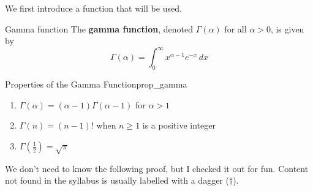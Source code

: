 We first introduce a function that will be used.

\begin{Definition}{Gamma function}{}
    The \textbf{gamma function},
    denoted $ \Gamma(\alpha) $ for all $ \alpha>0 $, is given by
    \[ \Gamma(\alpha)=\int_{0}^{\infty} x^{\alpha-1}e^{-x}\, d{x}  \]
\end{Definition}
\begin{Proposition}{Properties of the Gamma Function}{prop_gamma}
    \begin{enumerate}[label=(\arabic*)]
        \item\label{gamma_prop_1}$ \Gamma(\alpha)=(\alpha-1)\Gamma(\alpha-1) $ for $ \alpha>1 $
        \item\label{gamma_prop_2} $ \Gamma(n)=(n-1)! $ when $ n\geqslant 1 $ is a positive integer
        \item\label{gamma_prop_3} $ \displaystyle \Gamma\left( \frac{1}{2} \right)=\sqrt{\pi} $
    \end{enumerate}
\end{Proposition}
We don't need to know the following proof, but I checked it out for fun. Content not found in the
syllabus is usually labelled with a dagger ($ \dagger $).
